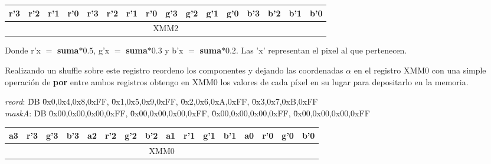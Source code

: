 \begin{table}[!h]
	\centering
	\begin{tabular}{| c | c | c | c | c | c | c | c | c | c | c | c | c | c | c | c |}
		\hline
		r'3 & r'2 & r'1 & r'0 & r'3 & r'2 & r'1 & r'0 & g'3 & g'2 & g'1 & g'0 & b'3 & b'2 & b'1 & b'0  \\ \hline
		\multicolumn{16}{c}{XMM2} \\
	\end{tabular}
\end{table}

Donde r'x $=$ \textbf{suma}$* 0.5$, g'x $=$ \textbf{suma}$* 0.3$ y b'x $=$ \textbf{suma}$* 0.2$. Las 'x' representan el pixel al que pertenecen.

Realizando un shuffle sobre este registro reordeno los componentes y dejando las coordenadas $\alpha$ en el registro XMM0 con una simple operación de \textbf{por} entre ambos registros obtengo en XMM0 los valores de cada píxel en su lugar para depositarlo en la memoria.

\begin{tabbing}
	\textit{reord}: \= DB \= 0x0,0x4,0x8,0xFF, \= 0x1,0x5,0x9,0xFF, \= 0x2,0x6,0xA,0xFF, \= 0x3,0x7,0xB,0xFF \\
	\textit{maskA}: \= DB \= 0x00,0x00,0x00,0xFF, \= 0x00,0x00,0x00,0xFF, \= 0x00,0x00,0x00,0xFF, \= 0x00,0x00,0x00,0xFF \\
\end{tabbing}

\begin{table}[!h]
	\centering
	\begin{tabular}{| c | c | c | c | c | c | c | c | c | c | c | c | c | c | c | c |}
		\hline
		a3 & r'3 & g'3 & b'3 & a2 & r'2 & g'2 & b'2 & a1 & r'1 & g'1 & b'1 & a0 & r'0 & g'0 & b'0  \\ \hline
		\multicolumn{16}{c}{XMM0} \\
	\end{tabular}
\end{table}